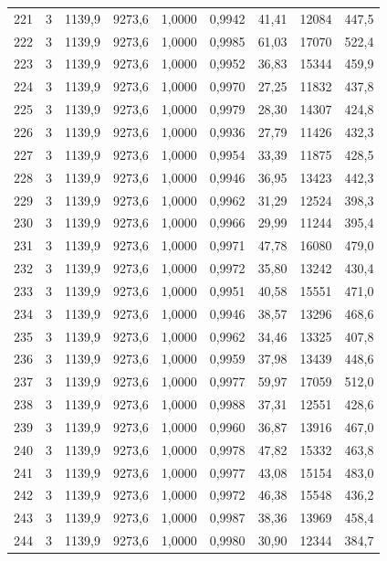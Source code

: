 \documentclass[11pt,a4paper]{article}
\begin{document}
{\begin{longtable}{r c r r r r r r r}
221 & 3 & 1139,9 & 9273,6 & 1,0000 & 0,9942 & 41,41 & 12084 & 447,5 \\
222 & 3 & 1139,9 & 9273,6 & 1,0000 & 0,9985 & 61,03 & 17070 & 522,4 \\
223 & 3 & 1139,9 & 9273,6 & 1,0000 & 0,9952 & 36,83 & 15344 & 459,9 \\
224 & 3 & 1139,9 & 9273,6 & 1,0000 & 0,9970 & 27,25 & 11832 & 437,8 \\
225 & 3 & 1139,9 & 9273,6 & 1,0000 & 0,9979 & 28,30 & 14307 & 424,8 \\
226 & 3 & 1139,9 & 9273,6 & 1,0000 & 0,9936 & 27,79 & 11426 & 432,3 \\
227 & 3 & 1139,9 & 9273,6 & 1,0000 & 0,9954 & 33,39 & 11875 & 428,5 \\
228 & 3 & 1139,9 & 9273,6 & 1,0000 & 0,9946 & 36,95 & 13423 & 442,3 \\
229 & 3 & 1139,9 & 9273,6 & 1,0000 & 0,9962 & 31,29 & 12524 & 398,3 \\
230 & 3 & 1139,9 & 9273,6 & 1,0000 & 0,9966 & 29,99 & 11244 & 395,4 \\
231 & 3 & 1139,9 & 9273,6 & 1,0000 & 0,9971 & 47,78 & 16080 & 479,0 \\
232 & 3 & 1139,9 & 9273,6 & 1,0000 & 0,9972 & 35,80 & 13242 & 430,4 \\
233 & 3 & 1139,9 & 9273,6 & 1,0000 & 0,9951 & 40,58 & 15551 & 471,0 \\
234 & 3 & 1139,9 & 9273,6 & 1,0000 & 0,9946 & 38,57 & 13296 & 468,6 \\
235 & 3 & 1139,9 & 9273,6 & 1,0000 & 0,9962 & 34,46 & 13325 & 407,8 \\
236 & 3 & 1139,9 & 9273,6 & 1,0000 & 0,9959 & 37,98 & 13439 & 448,6 \\
237 & 3 & 1139,9 & 9273,6 & 1,0000 & 0,9977 & 59,97 & 17059 & 512,0 \\
238 & 3 & 1139,9 & 9273,6 & 1,0000 & 0,9988 & 37,31 & 12551 & 428,6 \\
239 & 3 & 1139,9 & 9273,6 & 1,0000 & 0,9960 & 36,87 & 13916 & 467,0 \\
240 & 3 & 1139,9 & 9273,6 & 1,0000 & 0,9978 & 47,82 & 15332 & 463,8 \\
241 & 3 & 1139,9 & 9273,6 & 1,0000 & 0,9977 & 43,08 & 15154 & 483,0 \\
242 & 3 & 1139,9 & 9273,6 & 1,0000 & 0,9972 & 46,38 & 15548 & 436,2 \\
243 & 3 & 1139,9 & 9273,6 & 1,0000 & 0,9987 & 38,36 & 13969 & 458,4 \\
244 & 3 & 1139,9 & 9273,6 & 1,0000 & 0,9980 & 30,90 & 12344 & 384,7 \\

\end{longtable}}
\end{document}
